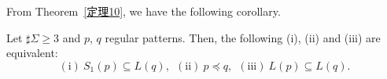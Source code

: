 

From Theorem~\ref{定理10}, we have the following corollary.
\begin{col}
    Let $\sharp\Sigma \geq 3$ and $p$, $q$ regular patterns.
    Then, the following (i), (ii) and (iii) are equivalent:
    \[
        (\mathrm{i})\ S_{1}(p) \subseteq L(q),\ \
        (\mathrm{ii})\ p \preceq q,\ \
        (\mathrm{iii})\ L(p) \subseteq L(q).
    \]
\end{col}